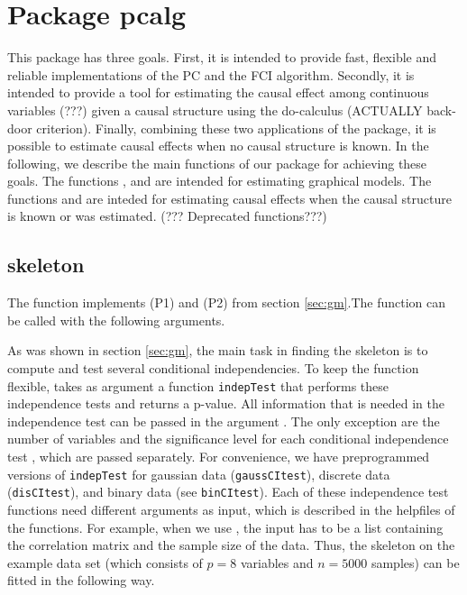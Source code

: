 \documentclass[article]{jss}
\begin{document}
\section{Package pcalg}
This package has three goals. First, it is intended to provide fast,
flexible and reliable implementations of the PC and the FCI
algorithm. Secondly, it is intended to provide a tool for estimating the
causal effect among continuous variables (???) given a causal structure
using the do-calculus (ACTUALLY back-door criterion). Finally, combining
these two applications of the package, it is possible to estimate causal
effects when no causal structure is known. In the following, we describe
the main functions of our package for achieving these goals. The functions
,  and  are intended for estimating
graphical models. The functions  and  are inteded
for estimating causal effects when the causal structure is known or was
estimated.  (??? Deprecated functions???)

\subsection{skeleton}
The function  implements (P1) and (P2) from section
\ref{sec:gm}.The function can be called with the following arguments.


As was shown in section \ref{sec:gm}, the main task in finding the skeleton
is to compute and test several conditional independencies. To keep the
function flexible,  takes as argument a function
\texttt{indepTest} that performs these independence tests and returns a
p-value. All information that is needed in the independence test can be
passed in the argument . The only exception are the number
of variables  and the significance level for each conditional
independence test , which are passed separately. For
convenience, we have preprogrammed versions of \texttt{indepTest} for
gaussian data (\texttt{gaussCItest}), discrete data (\texttt{disCItest}),
and binary data (see \texttt{binCItest}). Each of these independence test
functions need different arguments as input, which is described in the
helpfiles of the functions. For example, when we use
, the input has to be a list containing the correlation
matrix and the sample size of the data. Thus, the skeleton on the example
data set  (which consists of $p=8$ variables and
$n=5000$ samples) can be fitted in the following way.
\end{document}
